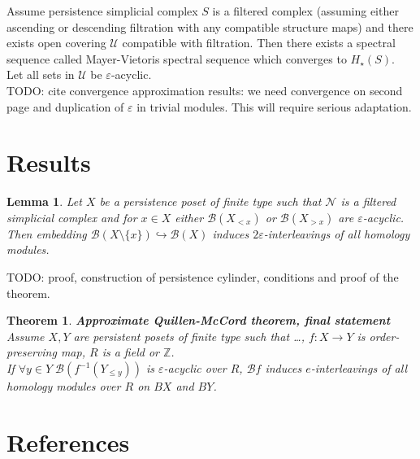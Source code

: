 \documentclass[a4paper, 12pt]{article}
\newtheorem{lemma}{Lemma}
\newtheorem{theorem}{Theorem}
\theoremstyle{definition}
\theoremstyle{remark}
\begin{document}
Assume persistence simplicial complex $S$ is a filtered complex (assuming either ascending or descending filtration with any compatible structure maps) and there exists open covering $\mathcal{U}$ compatible with filtration. Then there exists a spectral sequence called Mayer-Vietoris spectral sequence which converges to $H_{\star}(S)$. {\cite[Theorem 2.30]{GS16}}\\

Let all sets in $\mathcal{U}$ be $\varepsilon$-acyclic.\\
TODO: cite convergence approximation results: we need convergence on second page and duplication of $\varepsilon$ in trivial modules. This will require serious adaptation.

\section{Results}

\begin{lemma}
  Let $X$ be a persistence poset of finite type such that $\mathcal{N}$ is a filtered simplicial complex and for $x \in X$ either $\mathcal{B}(X_{< x})$ or $\mathcal{B}(X_{> x})$ are $\varepsilon$-acyclic. Then embedding $\mathcal{B}(X \setminus \{x\}) \hookrightarrow \mathcal{B}(X)$ induces $2\varepsilon$-interleavings of all homology modules.
\end{lemma}

TODO: proof, construction of persistence cylinder, conditions and proof of the theorem.\\

\begin{theorem} \textbf{Approximate Quillen-McCord theorem, final statement}\\
  Assume $X, Y$ are persistent posets of finite type such that \ldots, $f : X \to Y$ is order-preserving map, $R$ is a field or $\mathbb{Z}$.\\
  If $\forall y \in Y\;\mathcal{B}(f^{-1}(Y_{\leqslant y}))$ is $\varepsilon$-acyclic over $R$, $\mathcal{B}f$ induces $e$-interleavings of all homology modules over $R$ on $BX$ and $BY$.\\
\end{theorem}

\section{References}
\end{document}
